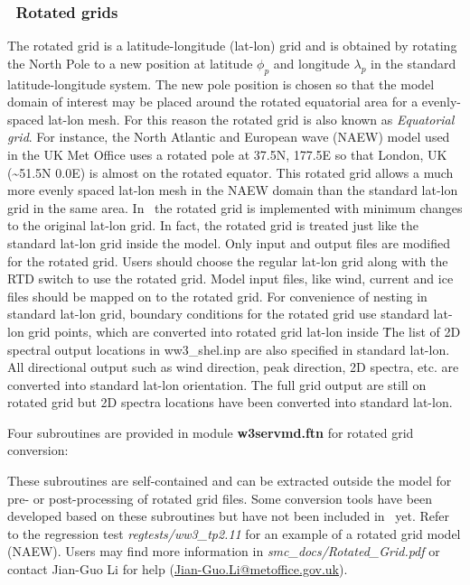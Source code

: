 \vssub
\subsubsection{~Rotated grids} \label{sub:num_space_rotagrid}

\noindent
The rotated grid is a latitude-longitude (lat-lon) grid and is obtained by
rotating the North Pole to a new position at latitude $\phi_{p}$ and
longitude $\lambda_{p}$ in the standard latitude-longitude system.  The new
pole position is chosen so that the model domain of interest may be placed
around the rotated equatorial area for a evenly-spaced lat-lon mesh. For this
reason the rotated grid is also known as \emph{Equatorial grid}. For instance,
the North Atlantic and European wave (NAEW) model used in the UK Met Office
uses a rotated pole at 37.5N, 177.5E so that London, UK
(\textasciitilde{}51.5N 0.0E) is almost on the rotated equator. This rotated
grid allows a much more evenly spaced lat-lon mesh in the NAEW domain than the
standard lat-lon grid in the same area. In \ws\, the rotated grid is
implemented with minimum changes to the original lat-lon grid. In fact, the
rotated grid is treated just like the standard lat-lon grid inside the
model. Only input and output files are modified for the rotated grid. Users
should choose the regular lat-lon grid along with the {\code RTD} switch to use the
rotated grid. Model input files, like wind, current and ice files should be
mapped on to the rotated grid. For convenience of nesting in standard lat-lon
grid, boundary conditions for the rotated grid use standard lat-lon grid
points, which are converted into rotated grid lat-lon inside \ws\. The list of 2D
spectral output locations in ww3\_shel.inp are also specified in standard
lat-lon. All directional output such as wind direction, peak direction, 2D
spectra, etc. are converted into standard lat-lon orientation. The full grid
output are still on rotated grid but 2D spectra locations have been converted
into standard lat-lon.

Four subroutines are provided in module {\bf w3servmd.ftn} for rotated grid
conversion:
\begin{vlist}
\end{vlist}
These subroutines are self-contained and can be extracted outside the model
for pre- or post-processing of rotated grid files.  Some conversion tools have
been developed based on these subroutines but have not been included in \ws\
yet. Refer to the regression test \emph{regtests/ww3\_tp2.11} for an example
of a rotated grid model (NAEW).  Users may find more information in
\emph{smc\_docs/Rotated\_Grid.pdf} or contact Jian-Guo Li for help
(\url{Jian-Guo.Li@metoffice.gov.uk}).
